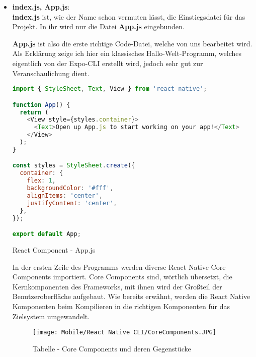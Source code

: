 \begin{itemize}
\item \textbf{index.js, App.js}:\\
\textbf{index.js} ist, wie der Name schon vermuten lässt, die Einstiegsdatei für das Projekt. In ihr wird
nur die Datei \textbf{App.js} eingebunden.

\textbf{App.js} ist also die erste richtige Code-Datei, welche von uns bearbeitet wird. Als Erklärung zeige
ich hier ein klassisches Hallo-Welt-Programm, welches eigentlich von der Expo-CLI erstellt wird,
jedoch sehr gut zur Veranschaulichung dient.

\begin{code}[htp]
\begin{lstlisting}[firstnumber=1,language=JavaScript, style=JSX]
import { StyleSheet, Text, View } from 'react-native';

function App() {
  return (
    <View style={styles.container}>
      <Text>Open up App.js to start working on your app!</Text>
    </View>
  );
}

const styles = StyleSheet.create({
  container: {
    flex: 1,
    backgroundColor: '#fff',
    alignItems: 'center',
    justifyContent: 'center',
  },
});

export default App;
\end{lstlisting}
\caption{React Component - App.js}
\end{code}

In der ersten Zeile des Programms werden diverse React Native Core Components importiert. Core
Components sind, wörtlich übersetzt, die Kernkomponenten des Frameworks, mit ihnen wird der Großteil
der Benutzeroberfläche aufgebaut. Wie bereits erwähnt, werden die React Native Komponenten beim
Kompilieren in die richtigen Komponenten für das Zielsystem umgewandelt.


\begin{figure}[H]
  \begin{center}
    \texttt{[image: Mobile/React Native CLI/CoreComponents.JPG]}
    \caption{Tabelle - Core Components und deren Gegenstücke \cite{reactNativeCoreComponents}}
  \end{center}
\end{figure}


\end{itemize}
